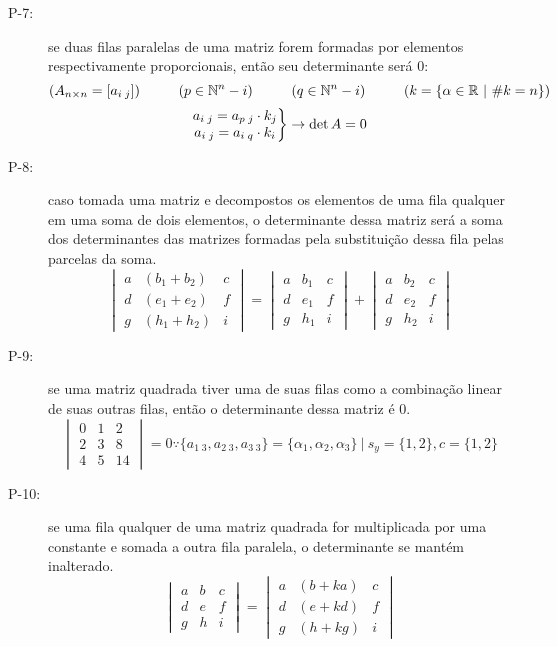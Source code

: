 \begin{description}
            \item[P-7:] se duas filas paralelas de uma matriz forem formadas por elementos respectivamente proporcionais, então seu determinante será 0:
            \[ (A_{n \times n} = [a_{i \; j}]) \hphantom{---} (p \in \mathbb{N}^n - i) \hphantom{---} (q \in \mathbb{N}^n - i) \hphantom{---} (k = \{ \alpha \in \mathbb{R} \ | \ \#k = n \}) \]
            \[ \begin{matrix} a_{i \; j} = a_{p \; j} \cdot k_j \\ a_{i \; j} = a_{i \; q} \cdot k_i \end{matrix} \bigg{\}} \rightarrow \det{A} = 0 \]
            \item[P-8:] caso tomada uma matriz e decompostos os elementos de uma fila qualquer em uma soma de dois elementos, o determinante dessa matriz será a soma dos determinantes das matrizes formadas pela substituição dessa fila pelas parcelas da soma. \eg
            \[ \begin{vmatrix} a & (b_1 + b_2) & c \\ d & (e_1 + e_2) & f \\ g & (h_1 + h_2) & i \end{vmatrix} = \begin{vmatrix} a & b_1 & c \\ d & e_1 & f \\ g & h_1 & i \end{vmatrix} + \begin{vmatrix} a & b_2 & c \\ d & e_2 & f \\ g & h_2 & i \end{vmatrix} \]
            \item[P-9:] se uma matriz quadrada tiver uma de suas filas como a combinação linear de suas outras filas, então o determinante dessa matriz é 0. \eg
            \[ \begin{vmatrix} 0 & 1 & 2 \\ 2 & 3 & 8 \\ 4 & 5 & 14 \end{vmatrix} = 0 \because \{a_{1 \; 3}, a_{2 \; 3}, a_{3 \; 3}\} = \{\alpha_1, \alpha_2, \alpha_3\} \ | \ s_y = \{1,2\}, c=\{1,2\} \]
            \item[P-10:] se uma fila qualquer de uma matriz quadrada for multiplicada por uma constante e somada a outra fila paralela, o determinante se mantém inalterado. \eg
            \[ \begin{vmatrix} a & b & c \\ d & e & f \\ g & h & i \end{vmatrix} = \begin{vmatrix} a & (b + ka) & c \\ d & (e + kd) & f \\ g & (h + kg) & i \end{vmatrix} \]

\end{description}
